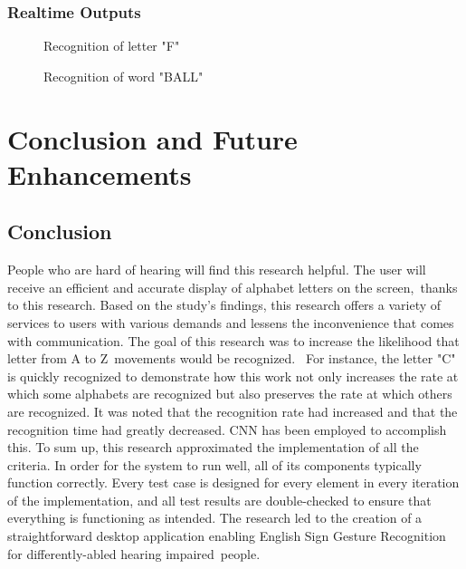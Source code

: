 \documentclass[fleqn, 11pt, twoside]{IOEGC}
\begin{document}
    \subsubsection{Realtime Outputs}
    \begin{figure}[H]\centering
    	\caption{Recognition of letter "F"}
    	\label{fig:recognition of letter "F"}
    \end{figure}
    \begin{figure}[H]\centering
    	\caption{Recognition of word "BALL"}
    	\label{fig:recognition of word "BALL"}
    \end{figure}
    
\section{Conclusion and Future Enhancements}
    \subsection{Conclusion}
        People who are hard of hearing will find this research helpful. The user will receive an efficient and accurate display of alphabet letters on the screen, thanks to this research. Based on the study's findings, this research offers a variety of services to users with various demands and lessens the inconvenience that comes with communication. The goal of this research was to increase the likelihood that letter from A to Z movements would be recognized.  For instance, the letter "C" is quickly recognized to demonstrate how this work not only increases the rate at which some alphabets are recognized but also preserves the rate at which others are recognized. It was noted that the recognition rate had increased and that the recognition time had greatly decreased. CNN has been employed to accomplish this.
        To sum up, this research approximated the implementation of all the criteria. In order for the system to run well, all of its components typically function correctly. Every test case is designed for every element in every iteration of the implementation, and all test results are double-checked to ensure that everything is functioning as intended.
The research led to the creation of a straightforward desktop application enabling English Sign Gesture Recognition for differently-abled hearing impaired people.
\end{document}
